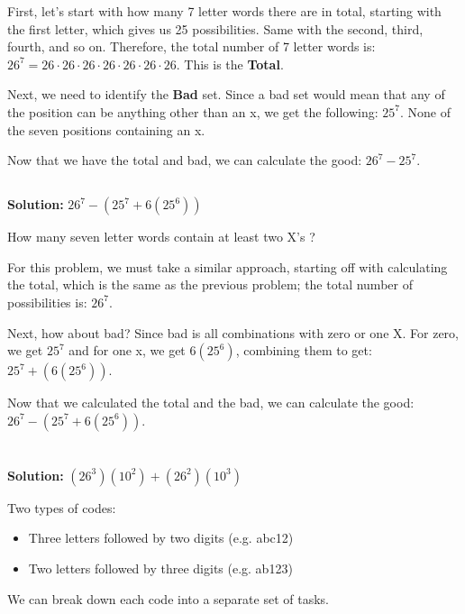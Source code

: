 \documentclass{article}
\begin{document}
First, let's start with how many 7 letter words there are in total, starting with the first letter, which gives us 25 possibilities. Same with the second, third, fourth, and so on. Therefore, the total number of 7 letter words is: $26^{7} = 26 \cdot 26 \cdot 26 \cdot 26 \cdot 26 \cdot 26 \cdot 26$. This is the \textbf{Total}.


Next, we need to identify the \textbf{Bad} set. Since a bad set would mean that any of the position can be anything other than an x, we get the following: $25^7$. None of the seven positions containing an x.

Now that we have the total and bad, we can calculate the good: $26^7 - 25^7$.


\subsection{}
\textbf{Solution: } $26^7 - (25^7 + 6(25^6))$

How many seven letter words contain at least two X's ?

For this problem, we must take a similar approach, starting off with calculating the total, which is the same as the previous problem; the total number of possibilities is: $26^7$.

Next, how about bad? Since bad is all combinations with zero or one X. For zero, we get $25^7$ and for one x, we get $6(25^6)$, combining them to get: $25^7 + (6(25^6))$.

Now that we calculated the total and the bad, we can calculate the good: $26^7 - (25^7 + 6(25^6))$.


\newpage

\section{}

\textbf{Solution: } $(26^3)(10^2) + (26^2)(10^3)$

Two types of codes:

\begin{itemize}
  \item Three letters followed by two digits (e.g. abc12)
  \item Two letters followed by three digits (e.g. ab123)

\end{itemize}

We can break down each code into a separate set of tasks.
\end{document}
